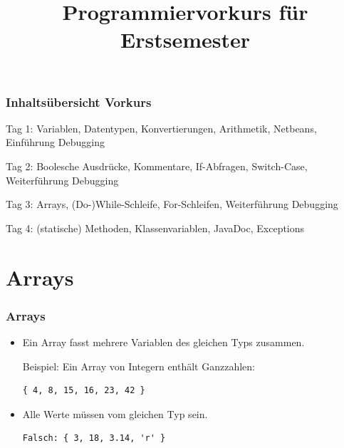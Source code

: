 \documentclass[final]{beamer}
\title{Programmiervorkurs für Erstsemester}
\begin{document}
\lstset{tabsize=4}
\lstset{basicstyle=\small}
\lstset{language=java}

\begin{frame}
	\titlepage
\end{frame}

\begin{frame}
	\frametitle{Inhaltsübersicht Vorkurs}
	\begin{itemize}
	{\color{gray}
		\item {Tag 1: Variablen, Datentypen, Konvertierungen, Arithmetik, Netbeans, Einführung Debugging}
		\item {Tag 2: Boolesche Ausdrücke, Kommentare, If-Abfragen, Switch-Case, Weiterführung Debugging}
		{\color{black}
		\item {Tag 3: Arrays, (Do-)While-Schleife, For-Schleifen, Weiterführung Debugging}
		}
		\item {Tag 4: (statische) Methoden, Klassenvariablen, JavaDoc, Exceptions}
	}
	\end{itemize}
\end{frame}

\section{Arrays}
\begin{frame}[containsverbatim]
	\frametitle{Arrays}
	\begin{itemize}
	\item{Ein Array fasst mehrere Variablen des gleichen Typs zusammen.

	Beispiel: Ein Array von Integern enthält Ganzzahlen:}
		\begin{lstlisting}
{ 4, 8, 15, 16, 23, 42 } 
		\end{lstlisting}
	\item{Alle Werte müssen vom gleichen Typ sein.}
		\begin{lstlisting}
Falsch: { 3, 18, 3.14, 'r' }
		\end{lstlisting}
	\end{itemize}
\end{frame}
\end{document}
